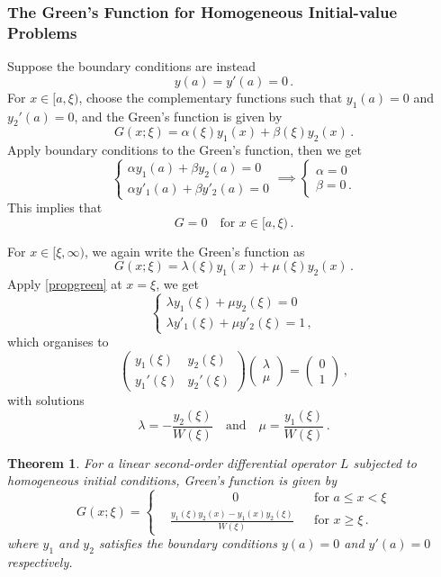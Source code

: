 \documentclass{article}
\theoremstyle{plain}\theoremheaderfont{\normalfont\itshape}\theorembodyfont{\rmfamily}\theoremseparator{.}\newtheorem*{rem}{Remark}\newtheorem*{ex}{Example}\newtheorem*{proof}{Proof}\newtheorem*{altp}{Alternative proof}
\theoremstyle{plain}\theoremheaderfont{\normalfont\bfseries}\theorembodyfont{\rmfamily}\theoremseparator{.}\newtheorem{thm}{Theorem}[section]\newtheorem{lem}[thm]{Lemma}\newtheorem{prop}[thm]{Proposition}\newtheorem*{cor}{Corollary}\newtheorem{defn}[thm]{Definition}\newtheorem{clm}[thm]{Claim}\newtheorem{clminproof}{Claim}
\theoremstyle{break}\theoremheaderfont{\normalfont\itshape}\theorembodyfont{\rmfamily}\theoremseparator{.\medskip}\newtheorem*{proofskip}{Proof}\newtheorem*{exs}{Examples}\newtheorem*{rems}{Remarks}
\theoremstyle{break}\theoremheaderfont{\normalfont\bfseries}\theorembodyfont{\rmfamily}\theoremseparator{.\medskip}\newtheorem{lemskip}[thm]{Lemma}\newtheorem{defnskip}[thm]{Definition}\newtheorem{propskip}[thm]{Proposition}\newtheorem{thmskip}[thm]{Theorem}
\numberwithin{equation}{section}
\begin{document}
	\subsubsection{The Green's Function for Homogeneous Initial-value Problems}
	Suppose the boundary conditions are instead
	\[y(a)=y'(a)=0\,.\]
	For \(x\in[a,\xi)\), choose the complementary functions such that \(y_1(a)=0\) and \(y_2'(a)=0\), and the Green's function is given by
	\[G(x;\xi)=\alpha(\xi)y_1(x)+\beta(\xi)y_2(x)\,.\]
	Apply boundary conditions to the Green's function, then we get
	\[\begin{cases}
		\alpha y_1(a)+\beta y_2(a)=0\\
		\alpha y'_1(a)+\beta y'_2(a)=0
	\end{cases}\implies\begin{cases}
		\alpha=0\\
		\beta=0\,.
	\end{cases}\]
	This implies that
	\[G=0\quad\text{for }x\in[a,\xi)\,.\]

	For \(x\in[\xi,\infty)\), we again write the Green's function as
	\[G(x;\xi)=\lambda(\xi)y_1(x)+\mu(\xi)y_2(x)\,.\]
	Apply \cref{propgreen} at \(x=\xi\), we get
	\[\begin{cases}
		\lambda y_1(\xi)+\mu y_2(\xi)=0\\
		\lambda y'_1(\xi)+\mu y'_2(\xi)=1\,,
	\end{cases}\]
	which organises to
	\[\begin{pmatrix}
		y_1(\xi) & y_2(\xi)\\
		y_1'(\xi) & y_2'(\xi)
	\end{pmatrix}\begin{pmatrix}
		\lambda\\
		\mu
	\end{pmatrix}=\begin{pmatrix}
		0\\
		1
	\end{pmatrix}\,,\]
	with solutions
	\[\lambda=-\frac{y_2(\xi)}{W(\xi)}\quad \text{and} \quad \mu=\frac{y_1(\xi)}{W(\xi)}\,.\]
	
	\begin{thm}
		For a linear second-order differential operator \(L\) subjected to homogeneous initial conditions, Green's function is given by
		\[G(x;\xi)=\left\{\begin{aligned}
			& \qquad\qquad\,\,\,\,\;0 && \text{for }a\le x<\xi\\
			&\frac{y_1(\xi)y_2(x)-y_1(x)y_2(\xi)}{W(\xi)} && \text{for }x\ge\xi\,.
		\end{aligned}\right.\]
		where \(y_1\) and \(y_2\) satisfies the boundary conditions \(y(a)=0\) and \(y'(a)=0\) respectively.
	\end{thm}
	
\end{document}
